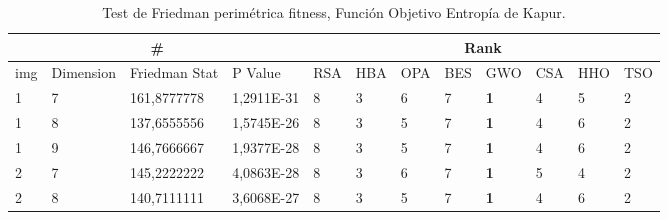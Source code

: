 \documentclass[conference]{IEEEtran}
\begin{document}
\begin{table}[]
	\centering
	\caption{Test de Friedman perimétrica fitness, Función Objetivo Entropía de Kapur.} 
	\begin{tabular}{|llll|llllllll|}
		\hline
		\multicolumn{4}{|c|}{\#} & \multicolumn{8}{c|}{Rank} \\ \hline
		\multicolumn{1}{|l|}{img} & \multicolumn{1}{l|}{Dimension} & \multicolumn{1}{l|}{Friedman Stat} & P Value    & \multicolumn{1}{l|}{RSA} & \multicolumn{1}{l|}{HBA} & \multicolumn{1}{l|}{OPA} & \multicolumn{1}{l|}{BES} & \multicolumn{1}{l|}{GWO}        & \multicolumn{1}{l|}{CSA} & \multicolumn{1}{l|}{HHO} & TSO                    \\ \hline 
		
		\multicolumn{1}{|l|}{1}   & \multicolumn{1}{l|}{7}         & \multicolumn{1}{l|}{161,8777778}   & 1,2911E-31 & \multicolumn{1}{l|}{8}   & \multicolumn{1}{l|}{3}   & \multicolumn{1}{l|}{6}   & \multicolumn{1}{l|}{7}   & \multicolumn{1}{l|}{\textbf{1}} & \multicolumn{1}{l|}{4}   & \multicolumn{1}{l|}{5}   & 2                      \\ \hline
		\multicolumn{1}{|l|}{1}   & \multicolumn{1}{l|}{8}         & \multicolumn{1}{l|}{137,6555556}   & 1,5745E-26 & \multicolumn{1}{l|}{8}   & \multicolumn{1}{l|}{3}   & \multicolumn{1}{l|}{5}   & \multicolumn{1}{l|}{7}   & \multicolumn{1}{l|}{\textbf{1}} & \multicolumn{1}{l|}{4}   & \multicolumn{1}{l|}{6}   & 2                      \\ \hline
		\multicolumn{1}{|l|}{1}   & \multicolumn{1}{l|}{9}         & \multicolumn{1}{l|}{146,7666667}   & 1,9377E-28 & \multicolumn{1}{l|}{8}   & \multicolumn{1}{l|}{3}   & \multicolumn{1}{l|}{5}   & \multicolumn{1}{l|}{7}   & \multicolumn{1}{l|}{\textbf{1}} & \multicolumn{1}{l|}{4}   & \multicolumn{1}{l|}{6}   & 2                      \\ \hline
		\multicolumn{1}{|l|}{2}   & \multicolumn{1}{l|}{7}         & \multicolumn{1}{l|}{145,2222222}   & 4,0863E-28 & \multicolumn{1}{l|}{8}   & \multicolumn{1}{l|}{3}   & \multicolumn{1}{l|}{6}   & \multicolumn{1}{l|}{7}   & \multicolumn{1}{l|}{\textbf{1}} & \multicolumn{1}{l|}{5}   & \multicolumn{1}{l|}{4}   & 2                      \\ \hline
		\multicolumn{1}{|l|}{2}   & \multicolumn{1}{l|}{8}         & \multicolumn{1}{l|}{140,7111111}   & 3,6068E-27 & \multicolumn{1}{l|}{8}   & \multicolumn{1}{l|}{3}   & \multicolumn{1}{l|}{5}   & \multicolumn{1}{l|}{7}   & \multicolumn{1}{l|}{\textbf{1}} & \multicolumn{1}{l|}{4}   & \multicolumn{1}{l|}{6}   & 2                      \\ \hline

\end{tabular}
\end{table}
\end{document}
